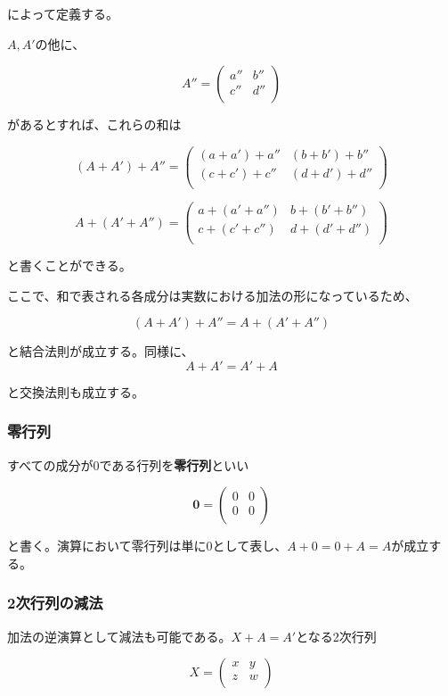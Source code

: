 \documentclass[dvipdfmx,autodetect-engine]{jsarticle}
\theoremstyle{definition}
\begin{document}
によって定義する。

$A,A'$の他に、

$$
A'' = \begin{pmatrix}
a'' & b'' \\
c'' & d'' \\
\end{pmatrix}
$$

があるとすれば、これらの和は

$$
(A + A') + A'' = \begin{pmatrix}
(a + a') + a'' & (b + b') + b'' \\
(c + c') + c'' & (d + d') + d'' \\
\end{pmatrix}
$$

$$
A + (A' + A'') = \begin{pmatrix}
a + (a' + a'') & b + (b' + b'') \\
c + (c' + c'') & d + (d' + d'') \\
\end{pmatrix}
$$

と書くことができる。

ここで、和で表される各成分は実数における加法の形になっているため、

$$
(A + A') + A'' = A + (A' + A'')
$$

と結合法則が成立する。同様に、
$$
A + A' = A' + A
$$

と交換法則も成立する。

\subsubsection{零行列}

すべての成分が0である行列を{\bf 零行列}といい

$$
\bm{0} = \begin{pmatrix}
0 & 0 \\
0 & 0 \\
\end{pmatrix}
$$

と書く。演算において零行列は単に$0$として表し、$A + 0 = 0 + A = A$が成立する。

\subsubsection{2次行列の減法}

加法の逆演算として減法も可能である。$X + A = A'$となる2次行列

$$
X = \begin{pmatrix}
x & y \\
z & w \\
\end{pmatrix}
$$
\end{document}
